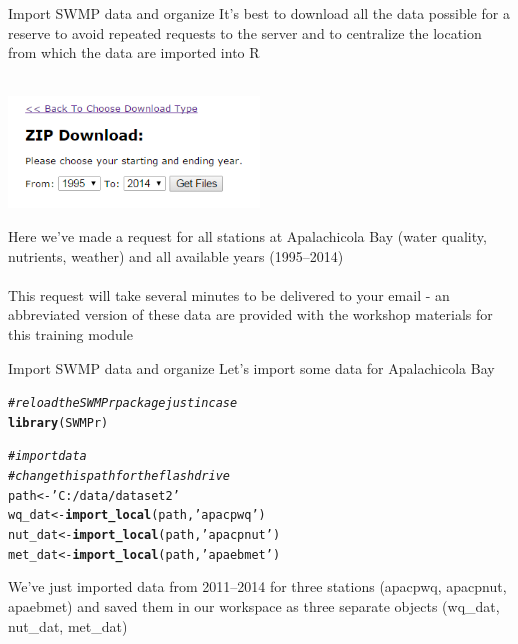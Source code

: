 \documentclass[xcolor=svgnames]{beamer}\usepackage[]{graphicx}\usepackage[]{color}
\makeatletter
\newcommand{\hlstr}[1]{\textcolor[rgb]{0.192,0.494,0.8}{#1}}%
\newcommand{\hlcom}[1]{\textcolor[rgb]{0.678,0.584,0.686}{\textit{#1}}}%
\newcommand{\hlstd}[1]{\textcolor[rgb]{0.345,0.345,0.345}{#1}}%
\newcommand{\hlkwb}[1]{\textcolor[rgb]{0.69,0.353,0.396}{#1}}%
\newcommand{\hlkwd}[1]{\textcolor[rgb]{0.737,0.353,0.396}{\textbf{#1}}}%
\newenvironment{kframe}{%
 \def\at@end@of@kframe{}%
 \ifinner\ifhmode%
  \def\at@end@of@kframe{\end{minipage}}%
  \begin{minipage}{\columnwidth}%
 \fi\fi%
 \def\FrameCommand##1{\hskip\@totalleftmargin \hskip-\fboxsep
 \colorbox{shadecolor}{##1}\hskip-\fboxsep
     \hskip-\linewidth \hskip-\@totalleftmargin \hskip\columnwidth}%
 \MakeFramed {\advance\hsize-\width
   \@totalleftmargin\z@ \linewidth\hsize
   \@setminipage}}%
 {\par\unskip\endMakeFramed%
 \at@end@of@kframe}
\newenvironment{knitrout}{}{} %
\makeatother
\begin{document}
\begin{frame}[t]{Import SWMP data and organize}
It's best to download all the data possible for a reserve to avoid repeated requests to the server and to centralize the location from which the data are imported into R \\~\\
\centerline{\includegraphics[width = 0.5\textwidth]{zip_eda2.png}}
Here we've made a request for all stations at Apalachicola Bay (water quality, nutrients, weather) and all available years (1995--2014) \\~\\
This request will take several minutes to be delivered to your email - an abbreviated version of these data are provided with the workshop materials for this training module
\end{frame}

\begin{frame}[fragile]{Import SWMP data and organize}
Let's import some data for Apalachicola Bay

\begin{knitrout}\scriptsize
{}\color{fgcolor}\begin{kframe}
\begin{alltt}
\hlcom{# reload the SWMPr package just in case}
\hlkwd{library}\hlstd{(SWMPr)}

\hlcom{# import data}
\hlcom{# change this path for the flash drive}
\hlstd{path} \hlkwb{<-} \hlstr{'C:/data/dataset2'}
\hlstd{wq_dat} \hlkwb{<-} \hlkwd{import_local}\hlstd{(path,} \hlstr{'apacpwq'}\hlstd{)}
\hlstd{nut_dat} \hlkwb{<-} \hlkwd{import_local}\hlstd{(path,} \hlstr{'apacpnut'}\hlstd{)}
\hlstd{met_dat} \hlkwb{<-} \hlkwd{import_local}\hlstd{(path,} \hlstr{'apaebmet'}\hlstd{)}
\end{alltt}
\end{kframe}
\end{knitrout}
We've just imported data from 2011--2014 for three stations (apacpwq, apacpnut, apaebmet) and saved them in our workspace as three separate objects (wq_dat, nut_dat, met_dat)
\end{frame}
\end{document}
